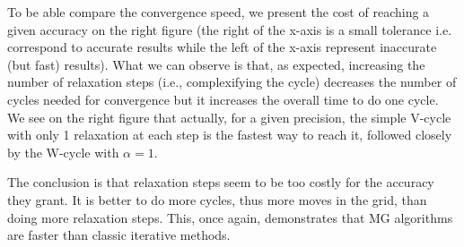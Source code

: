 To be able compare the convergence speed, we present the cost of reaching a
given accuracy on the right figure (the right of the x-axis is a small tolerance
i.e.  correspond to accurate results while the left of the x-axis represent
inaccurate (but fast) results). What we can observe is that, as expected,
increasing the number of relaxation steps (i.e., complexifying the cycle)
decreases the number of cycles needed for convergence but it increases the
overall time to do one cycle. We see on the right figure that actually, for a
given precision, the simple V-cycle with only 1 relaxation at each step is the
fastest way to reach it, followed closely by the W-cycle with $\alpha=1$.

The conclusion is that relaxation steps seem to be too costly for the accuracy
they grant. It is better to do more cycles, thus more moves in the grid, than
doing more relaxation steps. This, once again, demonstrates that MG algorithms
are faster than classic iterative methods.


